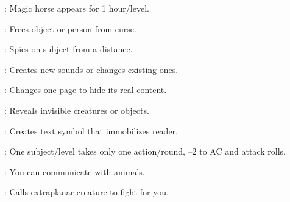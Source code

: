\begin{multicols}{2}
\begin{description*}
\item[\linkspell{Phantom Steed}:] Magic horse appears for 1 hour/level.
\item[\linkspell{Remove Curse}:] Frees object or person from curse.
\item[\linkspell{Scrying}:] Spies on subject from a distance.
\item[\linkspell{Sculpt Sound}:] Creates new sounds or changes existing ones.
\item[\linkspell{Secret Page}:] Changes one page to hide its real content.
\item[\linkspell{See Invisibility}:] Reveals invisible creatures or objects.
\item[\linkspell{Sepia Snake Sigil}:] Creates text symbol that immobilizes reader.
\item[\linkspell{Slow}:] One subject/level takes only one action/round, –2 to AC and attack rolls.
\item[\linkspell{Speak with Animals}:] You can communicate with animals.
\item[\linkspell{Summon Monster III}:] Calls extraplanar creature to fight for you.
\end{description*}


\end{multicols}
